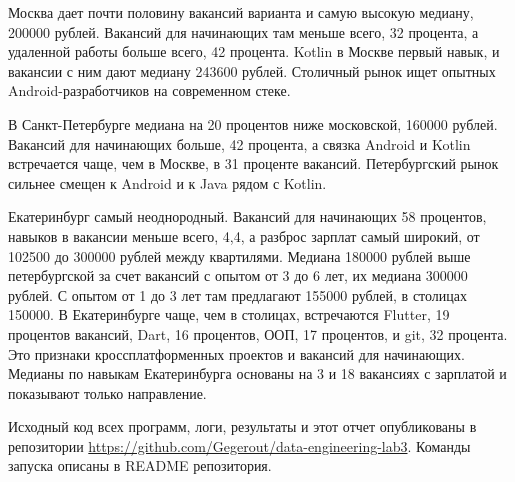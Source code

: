 Москва дает почти половину вакансий варианта и самую высокую медиану,
200000 рублей. Вакансий для начинающих там меньше всего, 32 процента, а
удаленной работы больше всего, 42 процента. Kotlin в Москве первый навык, и
вакансии с ним дают медиану 243600 рублей. Столичный рынок ищет опытных
Android-разработчиков на современном стеке.

В Санкт-Петербурге медиана на 20 процентов ниже московской, 160000 рублей.
Вакансий для начинающих больше, 42 процента, а связка Android и Kotlin
встречается чаще, чем в Москве, в 31 проценте вакансий. Петербургский рынок
сильнее смещен к Android и к Java рядом с Kotlin.

Екатеринбург самый неоднородный. Вакансий для начинающих 58 процентов,
навыков в вакансии меньше всего, 4,4, а разброс зарплат самый широкий, от
102500 до 300000 рублей между квартилями. Медиана 180000 рублей выше
петербургской за счет вакансий с опытом от 3 до 6 лет, их медиана 300000
рублей. С опытом от 1 до 3 лет там предлагают 155000 рублей, в столицах
150000.
В Екатеринбурге чаще, чем в столицах, встречаются Flutter, 19 процентов
вакансий, Dart, 16 процентов, ООП, 17 процентов, и git, 32 процента. Это
признаки кроссплатформенных проектов и вакансий для начинающих. Медианы
по навыкам Екатеринбурга основаны на 3 и 18 вакансиях с зарплатой и
показывают только направление.

Исходный код всех программ, логи, результаты и этот отчет опубликованы в
репозитории \url{https://github.com/Gegerout/data-engineering-lab3}.
Команды запуска описаны в README репозитория.
